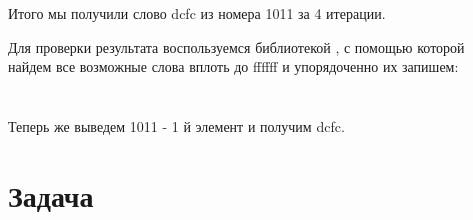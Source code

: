 \documentclass[letterpaper, 11pt]{extarticle}
\begin{document}
\noindent Итого мы получили слово \guillemotleft dcfc \guillemotright из номера 1011 за 4 итерации.\\

\begin{spacing}{1.5}
\noindent Для проверки результата воспользуемся библиотекой , с помощью которой
найдем все возможные слова вплоть до \guillemotleft ffffff \guillemotright 
и упорядоченно их запишем:\\
\end{spacing}

\vspace{-10pt}

\begin{gather*}
    [ \text{a}, \text{b}, \text{c}, \text{d}, \text{e}, \text{f}, \text{aa}, 
    \text{ab}, \text{ac}, \text{ad}, \text{ae}, \text{af}, \text{ba}, \text{bb}, 
    \text{bc}, \text{bd}, \text{be}, \text{bf}, \text{ca}, \text{cb}, \text{cc}, 
    \text{cd}, \text{ce}, \\
    \text{cf}, \text{da}, \text{db}, \text{dc}, \text{dd}, \text{de}, \text{df}, 
    \text{ea}, \text{eb}, \text{ec}, \text{ed}, \text{ee}, \text{ef}, \text{fa}, 
    \text{fb}, \text{fc}, \text{fd}, \text{fe}, \text{ff}, \text{aaa}, \text{aab}, \\
    \dots \\
    \text{cccccd}, \text{ccccce}, \text{cccccf}, \text{ccccda}, \text{ccccdb}, 
    \text{ccccdc}, \text{ccccdd}, \text{ccccde}, \text{ccccdf}, \\ 
    \text{ccccea}, \text{cccceb}, \text{ccccec}, \text{cccced}, \text{ccccee},  
    \text{ccccef}, \text{ccccfa}, \text{ccccfb}, \text{ccccfc},  \\ 
    \dots \\
    \text{ffffda}, \text{ffffdb}, \text{ffffdc} \text{ffffdd}, \text{ffffde}, 
    \text{ffffdf}, \text{ffffea}, \text{ffffeb}, \text{ffffec}, \\
    \text{ffffed}, \text{ffffee}, \text{ffffef}, \text{fffffa}, \text{fffffb}, 
    \text{fffffc}, \text{fffffd}, \text{fffffe}, \text{ffffff} ]
\end{gather*}\\

\noindent Теперь же выведем 1011 - 1 й элемент и получим \guillemotleft dcfc\guillemotright.

\newpage

\section*{Задача }
\end{document}
